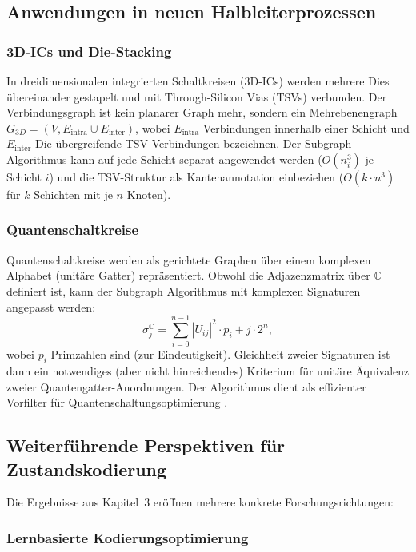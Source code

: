 ﻿\documentclass[a4paper,12pt]{article}
\theoremstyle{definition}
\begin{document}
\subsection{Anwendungen in neuen Halbleiterprozessen}

\subsubsection{3D-ICs und Die-Stacking}

In dreidimensionalen integrierten Schaltkreisen (3D-ICs) werden mehrere Dies übereinander
gestapelt und mit Through-Silicon Vias (TSVs) verbunden. Der Verbindungsgraph ist kein
planarer Graph mehr, sondern ein Mehrebenengraph $G_{3D} = (V, E_{\text{intra}} \cup E_{\text{inter}})$,
wobei $E_{\text{intra}}$ Verbindungen innerhalb einer Schicht und $E_{\text{inter}}$
Die-übergreifende TSV-Verbindungen bezeichnen. Der Subgraph Algorithmus kann auf
jede Schicht separat angewendet werden ($O(n_i^3)$ je Schicht $i$) und die TSV-Struktur
als Kantenannotation einbeziehen ($O(k \cdot n^3)$ für $k$ Schichten mit je $n$ Knoten).

\subsubsection{Quantenschaltkreise}

Quantenschaltkreise werden als gerichtete Graphen über einem komplexen Alphabet
(unitäre Gatter) repräsentiert. Obwohl die Adjazenzmatrix über $\mathbb{C}$ definiert
ist, kann der Subgraph Algorithmus mit komplexen Signaturen angepasst werden:
\[
  \sigma_j^{\mathbb{C}} = \sum_{i=0}^{n-1} |U_{ij}|^2 \cdot p_i + j \cdot 2^n,
\]
wobei $p_i$ Primzahlen sind (zur Eindeutigkeit). Gleichheit zweier Signaturen ist dann
ein notwendiges (aber nicht hinreichendes) Kriterium für unitäre Äquivalenz zweier
Quantengatter-Anordnungen. Der Algorithmus dient als effizienter Vorfilter für
Quantenschaltungsoptimierung \cite{nielsen2000quantum}.

\subsection{Weiterführende Perspektiven für Zustandskodierung}

Die Ergebnisse aus Kapitel~3 eröffnen mehrere konkrete Forschungsrichtungen:

\subsubsection{Lernbasierte Kodierungsoptimierung}
\end{document}
